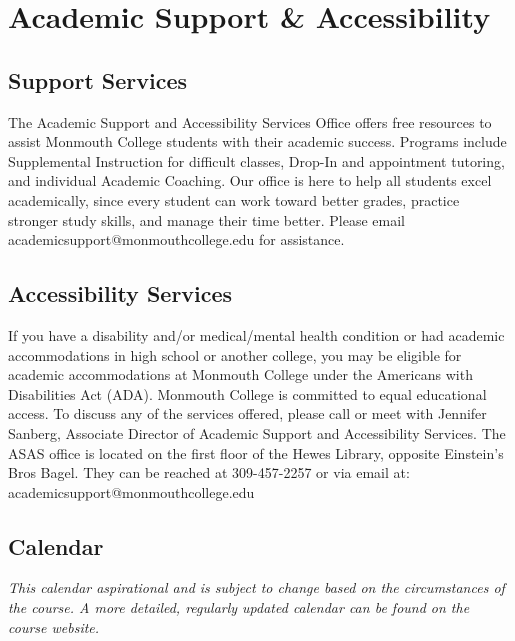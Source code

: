\documentclass[10pt]{article}
\begin{document}
\section{Academic Support \& Accessibility}

\subsection*{Support Services}
The Academic Support and Accessibility Services Office offers free resources to assist Monmouth College students with their academic success. Programs include Supplemental Instruction for difficult classes, Drop-In and appointment tutoring, and individual Academic Coaching. Our office is here to help all students excel academically, since every student can work toward better grades, practice stronger study skills, and manage their time better. Please email academicsupport@monmouthcollege.edu for assistance.

\subsection*{Accessibility Services}
If you have a disability and/or medical/mental health condition or had academic accommodations in high school or another college, you may be eligible for academic accommodations at Monmouth College under the Americans with Disabilities Act (ADA). Monmouth College is committed to equal educational access. To discuss any of the services offered, please call or meet with Jennifer Sanberg, Associate Director of Academic Support and Accessibility Services. The ASAS office is located on the first floor of the Hewes Library, opposite Einstein’s Bros Bagel. They can be reached at 309-457-2257 or via email at: academicsupport@monmouthcollege.edu

\subsection{Calendar}

\textit{This calendar aspirational and is subject to change based on the circumstances of the course. A more detailed, regularly updated calendar can be found on the course website. }
\end{document}
